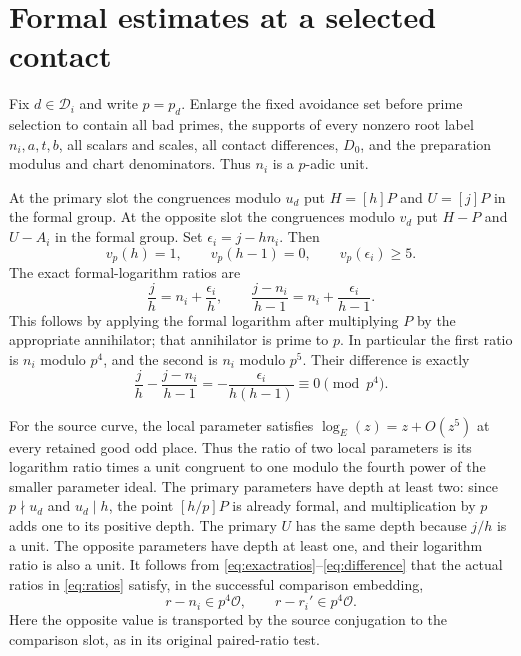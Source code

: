 \documentclass[11pt]{article}
\begin{document}
\section{Formal estimates at a selected contact}
\label{sec:formal}

Fix \(d\in\mathcal D_i\) and write \(p=p_d\).
Enlarge the fixed avoidance set before prime selection to
contain all bad primes, the supports of every nonzero root
label \(n_i,a,t,b\), all scalars and scales, all contact
differences, \(D_0\), and the preparation modulus and chart
denominators. Thus \(n_i\) is a \(p\)-adic unit.

At the primary slot the congruences modulo \(u_d\) put
\(H=[h]P\) and \(U=[j]P\) in the formal group. At the opposite
slot the congruences modulo \(v_d\) put \(H-P\) and \(U-A_i\)
in the formal group. Set \(\epsilon_i=j-hn_i\). Then
\[
       v_p(h)=1,\qquad v_p(h-1)=0,\qquad
       v_p(\epsilon_i)\ge5.
\]
The exact formal-logarithm ratios are
\begin{equation}\label{eq:exactratios}
 \frac jh=n_i+\frac{\epsilon_i}{h},\qquad
 \frac{j-n_i}{h-1}=n_i+\frac{\epsilon_i}{h-1}.
\end{equation}
This follows by applying the formal logarithm after multiplying
\(P\) by the appropriate annihilator; that annihilator is
prime to \(p\). In particular the first ratio is \(n_i\)
modulo \(p^4\), and the second is \(n_i\) modulo \(p^5\).
Their difference is exactly
\begin{equation}\label{eq:difference}
 \frac jh-\frac{j-n_i}{h-1}
             =-\frac{\epsilon_i}{h(h-1)}
             \equiv0\pmod {p^4}.
\end{equation}

For the source curve, the local parameter satisfies
\(\log_E(z)=z+O(z^5)\) at every retained good odd place.
Thus the ratio of two local parameters is its logarithm ratio
times a unit congruent to one modulo the fourth power of the
smaller parameter ideal. The primary parameters have depth
at least two: since \(p\nmid u_d\) and \(u_d\mid h\), the
point \([h/p]P\) is already formal, and multiplication by \(p\)
adds one to its positive depth. The primary \(U\) has the
same depth because \(j/h\) is a unit. The opposite parameters
have depth at least one, and their logarithm ratio is also a
unit. It follows from \eqref{eq:exactratios}--\eqref{eq:difference}
that the actual ratios in \eqref{eq:ratios} satisfy, in the
successful comparison embedding,
\begin{equation}\label{eq:truncated}
                   r-n_i\in p^4\mathcal O,\qquad
                   r-r_i'\in p^4\mathcal O .
\end{equation}
Here the opposite value is transported by the source conjugation
to the comparison slot, as in its original paired-ratio test.
\end{document}
